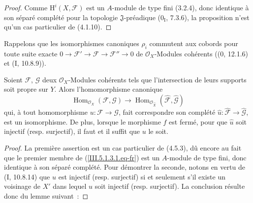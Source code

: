 \begin{proof}
Comme $\mathrm H^i(X,\mathcal F)$ est un $A$-module de type fini (3.2.4), donc
identique à son séparé complété pour la topologie $\mathfrak J$-préadique
($0_{\mathrm I}$, 7.3.6), la proposition n'est qu'un cas particulier de (4.1.10).
\end{proof}

Rappelons que les isomorphismes canoniques $\rho_i$ commutent aux cobords pour
toute suite exacte
$0\to\mathcal F'\to\mathcal F\to\mathcal F''\to0$ de $\mathcal O_X$-Modules
cohérents (($0$, 12.1.6) et (I, 10.8.9)).

\begin{corollary}[5.1.3]
\label{III.5.1.3-fr}
Soient $\mathcal F$, $\mathcal G$ deux $\mathcal O_X$-Modules cohérents tels que
l'intersection de leurs supports soit propre sur $Y$. Alors l'homomorphisme canonique
\begin{equation}
\operatorname{Hom}_{\mathcal O_X}(\mathcal F,\mathcal G)
\longrightarrow
\operatorname{Hom}_{\mathcal O_{\widehat X}}
(\widehat{\mathcal F},\widehat{\mathcal G})
\tag{5.1.3.1}
\label{III.5.1.3.1.eq-fr}
\end{equation}
qui, à tout homomorphisme $u:\mathcal F\to\mathcal G$, fait correspondre son
complété $\widehat u:\widehat{\mathcal F}\to\widehat{\mathcal G}$, est un
isomorphisme. De plus, lorsque le morphisme $f$ est fermé, pour que $\widehat u$ soit
injectif (resp. surjectif), il faut et il suffit que $u$ le soit.
\end{corollary}

\begin{proof}
La première assertion est un cas particulier de (4.5.3), dû encore au fait que le
premier membre de (\ref{III.5.1.3.1.eq-fr}) est un $A$-module de type fini, donc
identique à son séparé complété. Pour démontrer la seconde, notons en vertu de
(I, 10.8.14) que $\widehat u$ est injectif (resp. surjectif) si et seulement s'il existe
un voisinage de $X'$ dans lequel $u$ soit injectif (resp. surjectif). La conclusion
résulte donc du lemme suivant~:
\end{proof}


